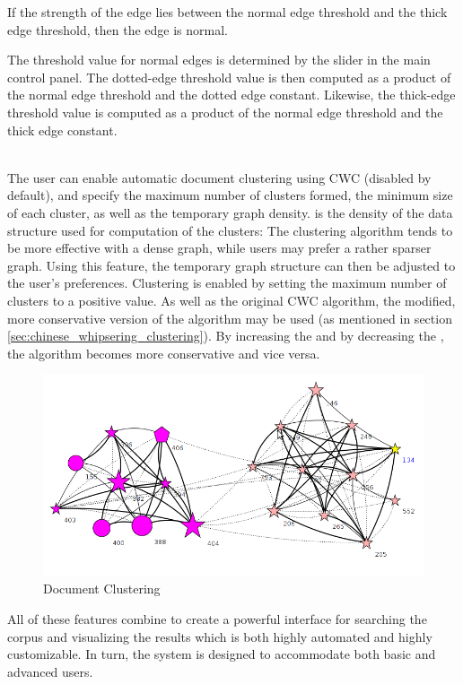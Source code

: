 \begin{description}
If the strength of the edge lies between the normal edge threshold and the thick edge threshold, then the edge is normal.

The threshold value for normal edges is determined by the slider in the main control panel. The dotted-edge threshold value is then computed as a product of the normal edge threshold and the dotted edge constant. Likewise, the thick-edge threshold value is computed as a product of the normal edge threshold and the thick edge constant.
\item[\scare{Clustering Settings}] \hfill \\
The user can enable automatic document clustering using CWC (disabled by default), and specify the maximum number of clusters formed, the minimum size of each cluster, as well as the temporary graph density.  is the density of the data structure used for computation of the clusters: The clustering algorithm tends to be more effective with a dense graph, while users may prefer a rather sparser graph. Using this feature, the temporary graph structure can then be adjusted to the user's preferences. Clustering is enabled by setting the maximum number of clusters to a positive value. As well as the original CWC algorithm, the modified, more conservative version of the algorithm may be used (as mentioned in section \ref{sec:chinese_whipsering_clustering}). By increasing the  and by decreasing the , the algorithm becomes more conservative and vice versa.

\begin{figure}[h]
\centering
\caption{Document Clustering}
\includegraphics[width=120mm]{clustering.png}
\end{figure}

\end{description}

All of these features combine to create a powerful interface for searching the corpus and visualizing the results which is both highly automated and highly customizable. In turn, the system is designed to accommodate both basic and advanced users.
